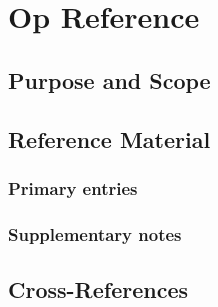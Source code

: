 \chapter{Op Reference}
\label{app:op_reference}


\section{Purpose and Scope}
\label{sec:app_op_reference:purpose}

\section{Reference Material}
\label{sec:app_op_reference:reference}

\subsection{Primary entries}
\label{ssec:app_op_reference:primary}

\subsection{Supplementary notes}
\label{ssec:app_op_reference:supplementary}

\section{Cross-References}
\label{sec:app_op_reference:xref}
